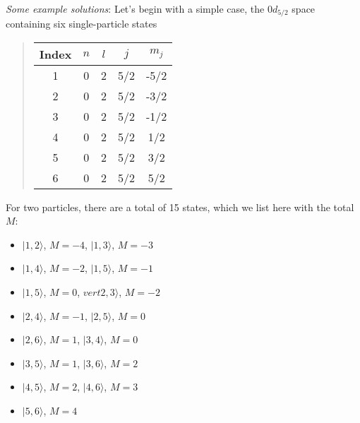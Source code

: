 \paragraph{}

\emph{Some example solutions}:  Let's begin with a simple case, the $0d_{5/2}$ space containing six single-particle states


\begin{quote}
\begin{tabular}{ccccc}
\hline
\multicolumn{1}{c}{ Index } & \multicolumn{1}{c}{ $n$ } & \multicolumn{1}{c}{ $l$ } & \multicolumn{1}{c}{ $j$ } & \multicolumn{1}{c}{ $m_j$ } \\
\hline
1     & 0   & 2   & 5/2 & -5/2  \\
2     & 0   & 2   & 5/2 & -3/2  \\
3     & 0   & 2   & 5/2 & -1/2  \\
4     & 0   & 2   & 5/2 & 1/2   \\
5     & 0   & 2   & 5/2 & 3/2   \\
6     & 0   & 2   & 5/2 & 5/2   \\
\hline
\end{tabular}
\end{quote}

\noindent
For two particles, there are a total of 15 states, which we list here with the total $M$:
\begin{itemize}
\item $\vert 1,2 \rangle$, $M= -4$,  $\vert 1,3 \rangle$, $M= -3$

\item $\vert  1,4 \rangle$, $M= -2$, $\vert 1,5 \rangle$, $M= -1$

\item $\vert 1,5 \rangle$, $M= 0$, $vert 2,3 \rangle$, $M= -2$

\item $\vert 2,4 \rangle$, $M= -1$, $\vert 2,5 \rangle$, $M= 0$

\item $\vert 2,6 \rangle$, $M= 1$, $\vert 3,4 \rangle$, $M= 0$

\item $\vert 3,5 \rangle$, $M= 1$, $\vert 3,6 \rangle$, $M= 2$

\item $\vert 4,5 \rangle$, $M= 2$, $\vert 4,6 \rangle$, $M= 3$

\item $\vert 5,6 \rangle$, $M= 4$
\end{itemize}

